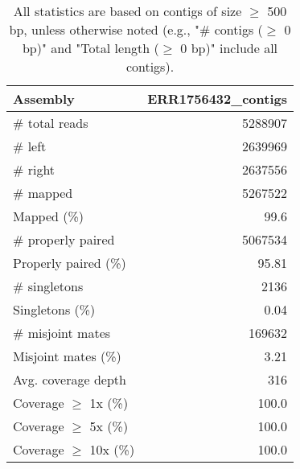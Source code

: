 \documentclass[12pt,a4paper]{article}
\begin{document}
\begin{table}[ht]
\begin{center}
\caption{All statistics are based on contigs of size $\geq$ 500 bp, unless otherwise noted (e.g., "\# contigs ($\geq$ 0 bp)" and "Total length ($\geq$ 0 bp)" include all contigs).}
\begin{tabular}{|l*{1}{|r}|}
\hline
Assembly & ERR1756432\_contigs \\ \hline
\# total reads & 5288907 \\ \hline
\# left & 2639969 \\ \hline
\# right & 2637556 \\ \hline
\# mapped & 5267522 \\ \hline
Mapped (\%) & 99.6 \\ \hline
\# properly paired & 5067534 \\ \hline
Properly paired (\%) & 95.81 \\ \hline
\# singletons & 2136 \\ \hline
Singletons (\%) & 0.04 \\ \hline
\# misjoint mates & 169632 \\ \hline
Misjoint mates (\%) & 3.21 \\ \hline
Avg. coverage depth & 316 \\ \hline
Coverage $\geq$ 1x (\%) & 100.0 \\ \hline
Coverage $\geq$ 5x (\%) & 100.0 \\ \hline
Coverage $\geq$ 10x (\%) & 100.0 \\ \hline
\end{tabular}
\end{center}
\end{table}
\end{document}
